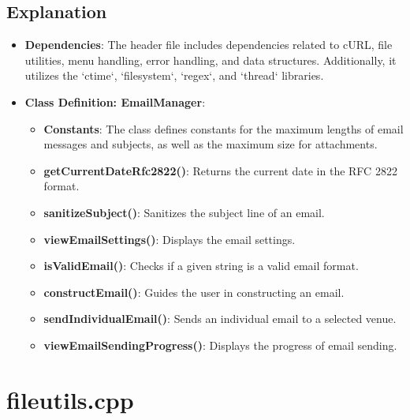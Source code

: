 \documentclass{article}
\begin{document}
	\subsection*{Explanation}
	\begin{itemize}
		\item \textbf{Dependencies}: The header file includes dependencies related to cURL, file utilities, menu handling, error handling, and data structures. Additionally, it utilizes the `ctime`, `filesystem`, `regex`, and `thread` libraries.
		\item \textbf{Class Definition: EmailManager}:
		\begin{itemize}
			\item \textbf{Constants}: The class defines constants for the maximum lengths of email messages and subjects, as well as the maximum size for attachments.
			\item \textbf{getCurrentDateRfc2822()}: Returns the current date in the RFC 2822 format.
			\item \textbf{sanitizeSubject()}: Sanitizes the subject line of an email.
			\item \textbf{viewEmailSettings()}: Displays the email settings.
			\item \textbf{isValidEmail()}: Checks if a given string is a valid email format.
			\item \textbf{constructEmail()}: Guides the user in constructing an email.
			\item \textbf{sendIndividualEmail()}: Sends an individual email to a selected venue.
			\item \textbf{viewEmailSendingProgress()}: Displays the progress of email sending.
		\end{itemize}
	\end{itemize}
	
	\section{fileutils.cpp}
	
\end{document}
